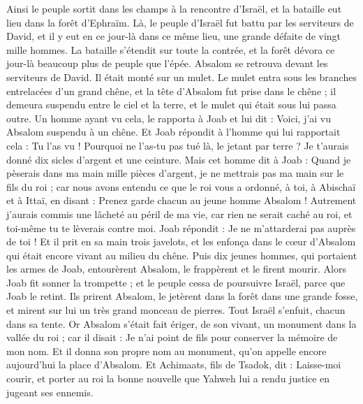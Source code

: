 \begin{multicols}{2}
Ainsi le peuple sortit dans les champs à la rencontre d'Israël, et la bataille eut lieu dans la forêt d'Ephraïm.
Là, le peuple d'Israël fut battu par les serviteurs de David, et il y eut en ce jour-là dans ce même lieu, une grande défaite de vingt mille hommes.
La bataille s'étendit sur toute la contrée, et la forêt dévora ce jour-là beaucoup plus de peuple que l'épée.
Absalom se retrouva devant les serviteurs de David. Il était monté sur un mulet. Le mulet entra sous les branches entrelacées d'un grand chêne, et la tête d'Absalom fut prise dans le chêne ; il demeura suspendu entre le ciel et la terre, et le mulet qui était sous lui passa outre.
Un homme ayant vu cela, le rapporta à Joab et lui dit : Voici, j'ai vu Absalom suspendu à un chêne.
Et Joab répondit à l'homme qui lui rapportait cela : Tu l'as vu ! Pourquoi ne l'as-tu pas tué là, le jetant par terre ? Je t'aurais donné dix sicles d'argent et une ceinture.
Mais cet homme dit à Joab : Quand je pèserais dans ma main mille pièces d'argent, je ne mettrais pas ma main sur le fils du roi ; car nous avons entendu ce que le roi vous a ordonné, à toi, à Abischaï et à Ittaï, en disant : Prenez garde chacun au jeune homme Absalom !
Autrement j'aurais commis une lâcheté au péril de ma vie, car rien ne serait caché au roi, et toi-même tu te lèverais contre moi.
Joab répondit : Je ne m'attarderai pas auprès de toi ! Et il prit en sa main trois javelots, et les enfonça dans le cœur d'Absalom qui était encore vivant au milieu du chêne.
Puis dix jeunes hommes, qui portaient les armes de Joab, entourèrent Absalom, le frappèrent et le firent mourir.
Alors Joab fit sonner la trompette ; et le peuple cessa de poursuivre Israël, parce que Joab le retint.
Ils prirent Absalom, le jetèrent dans la forêt dans une grande fosse, et mirent sur lui un très grand monceau de pierres. Tout Israël s'enfuit, chacun dans sa tente.
Or Absalom s'était fait ériger, de son vivant, un monument dans la vallée du roi ; car il disait : Je n'ai point de fils pour conserver la mémoire de mon nom. Et il donna son propre nom au monument, qu'on appelle encore aujourd'hui la place d'Absalom.
Et Achimaats, fils de Tsadok, dit : Laisse-moi courir, et porter au roi la bonne nouvelle que Yahweh lui a rendu justice en jugeant ses ennemis.

\end{multicols}

